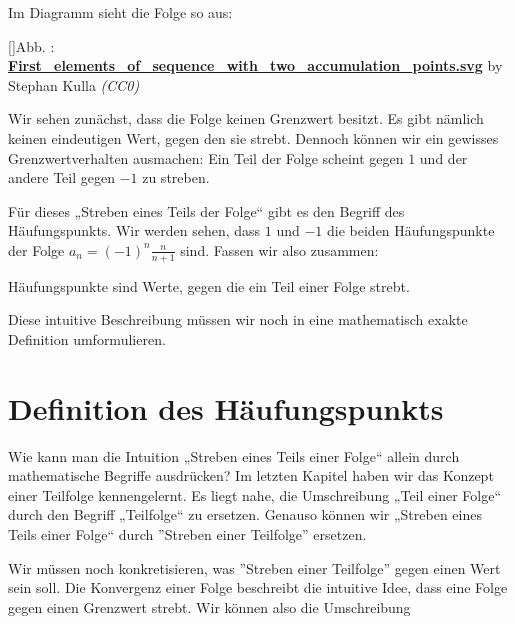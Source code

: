 \documentclass[fontsize=9pt,
               parskip=half-,
               DIV=14,
               listof=chapterentry,
               tocflat]{scrbook}
\newcounter{imagelabel}
\begin{document}
Im Diagramm sieht die Folge so aus:

[]{Abb. : \protect\href{https://commons.wikimedia.org/wiki/File:First_elements_of_sequence_with_two_accumulation_points.svg}{\textbf{First\allowbreak\_elements\allowbreak\_of\allowbreak\_sequence\allowbreak\_with\allowbreak\_two\allowbreak\_accumulation\allowbreak\_points.svg}} by Stephan Kulla \textit{(CC0)}}\begin{center}
\end{center}

Wir sehen zunächst, dass die Folge keinen Grenzwert besitzt. Es gibt nämlich keinen eindeutigen Wert, gegen den sie strebt. Dennoch können wir ein gewisses Grenzwertverhalten ausmachen: Ein Teil der Folge scheint gegen $1$ und der andere Teil gegen $-1$ zu streben.

Für dieses „Streben eines Teils der Folge“ gibt es den Begriff des Häufungspunkts. Wir werden sehen, dass $1$ und $-1$ die beiden Häufungspunkte der Folge $a_{n}=(-1)^{n}{\tfrac {n}{n+1}}$ sind. Fassen wir also zusammen:

\begin{importantparagraph*}
Häufungspunkte sind Werte, gegen die ein Teil einer Folge strebt.

\end{importantparagraph*}

Diese intuitive Beschreibung müssen wir noch in eine mathematisch exakte Definition umformulieren.

\section{Definition des Häufungspunkts}

Wie kann man die Intuition „Streben eines Teils einer Folge“ allein durch mathematische Begriffe ausdrücken? Im letzten Kapitel haben wir das Konzept einer Teilfolge kennengelernt. Es liegt nahe, die Umschreibung „Teil einer Folge“ durch den Begriff „Teilfolge“ zu ersetzen. Genauso können wir „Streben eines Teils einer Folge“ durch {''}Streben einer Teilfolge{''} ersetzen.

Wir müssen noch konkretisieren, was {''}Streben einer Teilfolge{''} gegen einen Wert sein soll. Die Konvergenz einer Folge beschreibt die intuitive Idee, dass eine Folge gegen einen Grenzwert strebt. Wir können also die Umschreibung
\end{document}

